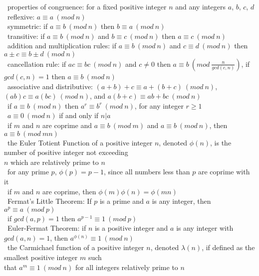 \documentclass[10pt,letterpaper]{scrartcl}
\newcommand{\tbul}{\textbullet}
\newcommand{\tend}{\>\textendash}
\begin{document}
\begin{tabbing}
\tbul\ properties of congruence: for a fixed positive integer $n$ and any integers $a$, $b$, $c$, $d$ \\
\tend\ reflexive: $a\equiv a\ (mod\ n)$ \\
\tend\ symmetric: if $a\equiv b\ (mod\ n)$ then $b\equiv a\ (mod\ n)$ \\
\tend\ transitive: if $a\equiv b\ (mod\ n)$ and $b\equiv c\ (mod\ n)$ then $a\equiv c\ (mod\ n)$\\
\tend\ addition and multiplication rules: if $a\equiv b\ (mod\ n)$ and $c\equiv d\ (mod\ n)$ then $a\pm c\equiv b\pm d\ (mod\ n)$ \\
\tend\ cancellation rule: if $ac\equiv bc\ (mod\ n)$ and $c\neq 0$ then $a\equiv b\ (mod\ \frac{n}{gcd(c,n)})$, if $gcd(c,n)=1$ then $a\equiv b\ (mod\ n)$\\
\tend\ associative and distributive: $(a+b)+c\equiv a+(b+c)\ (mod\ n)$, $(ab)c\equiv a(bc)\ (mod\ n)$, and $a(b+c)\equiv ab+bc\ (mod\ n)$\\
\tend\ if $a\equiv b\ (mod\ n)$ then $a^r\equiv b^r\ (mod\ n)$, for any integer $r\geq 1$\\
\tend\ $a\equiv 0\ (mod\ n)$ if and only if $n|a$\\
\tbul\ if $m$ and $n$ are coprime and $a\equiv b\ (mod\ m)$ and $a\equiv b\ (mod\ n)$, then $a\equiv b\ (mod\ mn)$ \\
\tbul\ the Euler Totient Function of a positive integer $n$, denoted $\phi (n)$, is the number of positive integer not exceeding \\ $n$ which are relatively prime to $n$ \\
\tbul\ for any prime $p$, $\phi (p)=p-1$, since all numbers less than $p$ are coprime with it \\
\tbul\ if $m$ and $n$ are coprime, then $\phi (m)\phi (n)=\phi (mn)$ \\
\tbul\ Fermat's Little Theorem: If $p$ is a prime and $a$ is any integer, then $a^p\equiv a\ (mod\ p)$ \\
\tend\ if $gcd(a, p)=1$ then $a^{p-1}\equiv 1\ (mod\ p)$ \\
\tbul\ Euler-Fermat Theorem: if $n$ is a positive integer and $a$ is any integer with $gcd(a,n)=1$, then $a^{\phi (n)}\equiv 1\ (mod\ n)$ \\
\tbul\ the Carmichael function of a positive integer $n$, denoted $\lambda (n)$, if defined as the smallest positive integer $m$ such \\ that $a^m\equiv 1\ (mod\ n)$ for all integers relatively prime to $n$ \\

\end{tabbing}
\end{document}

